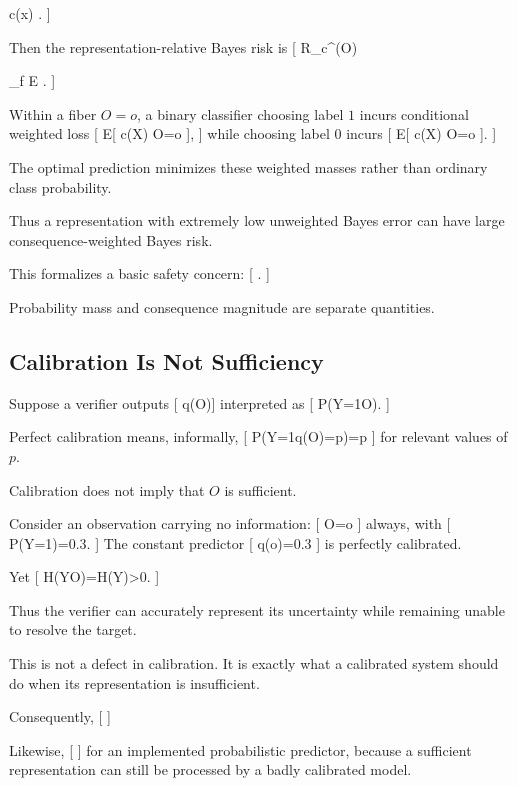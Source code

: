 \documentclass[11pt]{article}
\begin{document}
c(x)
.
]

Then the representation-relative Bayes risk is
[
R_c^\star(O)

\inf_f
\mathbb E
.
]

Within a fiber $O=o$, a binary classifier choosing label $1$ incurs conditional weighted loss
[
\mathbb E[
c(X)
\mid O=o
],
]
while choosing label $0$ incurs
[
\mathbb E[
c(X)
\mid O=o
].
]

The optimal prediction minimizes these weighted masses rather than ordinary class probability.

Thus a representation with extremely low unweighted Bayes error can have large consequence-weighted Bayes risk.

This formalizes a basic safety concern:
[
\not\Rightarrow
{}.
]

Probability mass and consequence magnitude are separate quantities.

\subsection{Calibration Is Not Sufficiency}

Suppose a verifier outputs
[
q(O)\in[0,1]
]
interpreted as
[
P(Y=1\mid O).
]

Perfect calibration means, informally,
[
P(Y=1\mid q(O)=p)=p
]
for relevant values of $p$.

Calibration does not imply that $O$ is sufficient.

Consider an observation carrying no information:
[
O=o
]
always, with
[
P(Y=1)=0.3.
]
The constant predictor
[
q(o)=0.3
]
is perfectly calibrated.

Yet
[
H(Y\mid O)=H(Y)>0.
]

Thus the verifier can accurately represent its uncertainty while remaining unable to resolve the target.

This is not a defect in calibration. It is exactly what a calibrated system should do when its representation is insufficient.

Consequently,
[
]

Likewise,
[
\not\Rightarrow
{}
]
for an implemented probabilistic predictor, because a sufficient representation can still be processed by a badly calibrated model.
\end{document}
